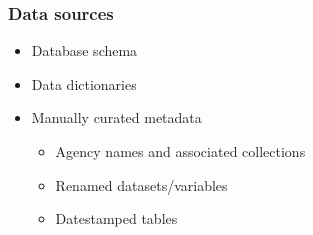\documentclass[aspectratio=169]{beamer}
\begin{document}
\begin{frame}
    \frametitle{Data sources}

    \begin{itemize}
        \item Database schema
        \item Data dictionaries
        \item Manually curated metadata
        \begin{itemize}
            \item Agency names and associated collections
            \item Renamed datasets/variables
            \item Datestamped tables
        \end{itemize}
    \end{itemize}
\end{frame}
\end{document}
